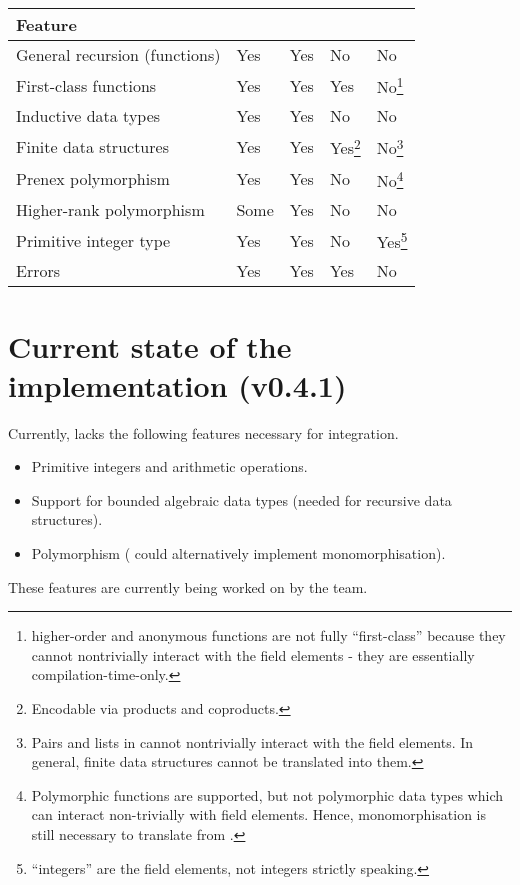 \documentclass[
    9pt,            %
    techreport,        %
    affiltop,       %
]{art}
\begin{document}
\vspace*{2mm}
\begin{minipage}[b]{\hsize}\centering

\begin{tabular}{lllll}
\hline
\textbf{Feature} & \textbf{\Juvix{}} & \textbf{\JuvixCore{}} & \textbf{\Geb{}} & \textbf{\VampIR{}} \\ \hline
General recursion (functions)   &  Yes   &  Yes   &  No  &   No  \\
First-class functions   &  Yes   &  Yes   &  Yes  &   No\footnote{\VampIR{} higher-order and anonymous functions are not fully ``first-class'' because they cannot nontrivially interact with the field elements - they are essentially compilation-time-only.}  \\
Inductive data types  &  Yes   &  Yes   &  No  &   No  \\
Finite data structures  &  Yes   &  Yes   &  Yes\footnote{Encodable via products and coproducts.} & No\footnote{Pairs and lists in \VampIR{} cannot nontrivially interact with the field elements. In general, finite \JuvixCore{} data structures cannot be translated into them.}  \\
Prenex polymorphism  &  Yes   &  Yes   &  No  &  No\footnote{Polymorphic functions are supported, but not polymorphic data types which can interact non-trivially with field elements. Hence, monomorphisation is still necessary to translate from \JuvixCore{}.} \\
Higher-rank polymorphism  &  Some   &  Yes   &  No  &   No  \\
Primitive integer type  &  Yes   &  Yes   &  No  &   Yes\footnote{\VampIR{} ``integers'' are the field elements, not integers strictly speaking.} \\
Errors &  Yes   &  Yes   &  Yes  &   No \\
\hline
\end{tabular}
\end{minipage}

\section{Current state of the \Geb{} implementation (v0.4.1) }\label{sec_geb}

Currently, \Geb{} lacks the following features necessary for \Juvix{}
integration.
\begin{itemize}
\item Primitive integers and arithmetic operations.
\item Support for bounded algebraic data types (needed for recursive data structures).
\item Polymorphism (\Juvix{} could alternatively implement monomorphisation).
\end{itemize}
These features are currently being worked on by the \Geb{} team.
\end{document}
